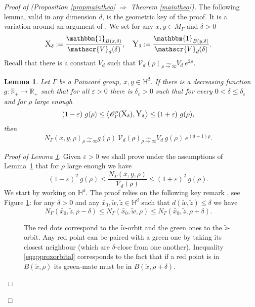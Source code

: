 \documentclass[JEP,XML,SOM,Unicode,NoFloatCountersInSection,published]{cedram}
\let\mathcal\mathscr
\let\epsilon\varepsilon
\theoremstyle{plain}
\newtheorem{lemma}[equation]{Lemma}
\theoremstyle{definition}
\newcommand{\HH}{\mathbb{H}}
\newcommand{\RR}{\mathbb{R}}
\newcommand{\equivaut}[1]{\underset{#1}{\sim}}
\begin{document}
\begin{proof}[Proof of (Proposition \ref{propmaintheo} $\Rightarrow$ Theorem \ref{maintheo})]
The following lemma, valid in any dimension $d$, is the geometric key of the proof. It is a variation around an argument of \cite{arteskinmac}. We set for any $x,y \in M_{\Gamma}$ and $\delta > 0$
\[
\text{\large{X}}_{\delta} := \frac{\mathbbm{1}_{B(x,\delta)}}{\mathcal{V}_d(\delta)}, \quad \text{\large{Y}}_{\delta} := \frac{\mathbbm{1}_{B(y,\delta)}}{\mathcal{V}_d(\delta)}.
\]
Recall that there is a constant $V_d$ such that $\mathcal{V}_d(\rho) \equivaut{\rho \to \infty} V_d \ e^{ 2 \rho}$.

\begin{lemma}
\label{lemmapproxorbital}
Let $\Gamma$ be a Poincaré group, $x,y \in \mathbb{H}^d$. If there is a decreasing function $g : \RR_+ \to \RR_+$ such that for all $\epsilon > 0$ there is $\delta_{\epsilon} > 0$ such that for every $ 0 < \delta \le \delta_{\epsilon}$ and for $\rho$ large enough
\[
(1 - \epsilon) \ g(\rho) \le \left< \mathcal{O}_{\Gamma}^{\rho}(\text{\large{X}}_{\delta}), \text{\large{Y}}_{\delta} \right> \le (1 + \epsilon) \ g(\rho),
\]
then
\[
N_{\Gamma}(x,y,\rho) \equivaut{\rho \to \infty} g(\rho) \ \mathcal{V}_d(\rho) \equivaut{\rho \to \infty} V_d \ g(\rho) \ e^{(d-1)\rho}.
\]
\end{lemma}

\begin{proof}[Proof of Lemma \ref{lemmapproxorbital}]
Given $\epsilon > 0$ we shall prove under the assumptions of Lem\-ma~\ref{lemmapproxorbital} that for $\rho$ large enough we have
\[
(1 -\epsilon)^2 \ g(\rho) \le \frac{N_{\Gamma}(x,y,\rho)}{\mathcal{V}_d(\rho)} \le (1 +\epsilon)^2 \ g(\rho).
\]
We start by working on $\HH^d$. The proof relies on the following key remark \cite[\S 2]{arteskinmac}, see Figure \ref{figure dessin}: for any $\delta >0$ and any $\tilde{x_0},\tilde{w},\tilde{z} \in \mathbb{H}^d$ such that $d(\tilde{w},\tilde{z}) \le \delta$ we have
\begin{equation}
\label{eqapproxorbital}
N_{\Gamma}(\tilde{x_0},\tilde{z}, \rho - \delta) \le N_{\Gamma}(\tilde{x_0},\tilde{w}, \rho) \le N_{\Gamma}(\tilde{x_0},\tilde{z}, \rho + \delta).
\end{equation}

\begin{figure}[htb]
\begin{center}
\def\svgwidth{0.6 \columnwidth}

\caption{The red dots correspond to the $\tilde{w}$-orbit and the green ones to the $\tilde{z}$-orbit. Any red point can be paired with a green one by taking its closest neighbour (which are $\delta$-close from one another). Inequality \eqref{eqapproxorbital} corresponds to the fact that if a red point is in $B(\tilde{x},\rho)$ its green-mate must be in $B(\tilde{x}, \rho + \delta)$.}
\label{figure dessin}
\end{center}
\end{figure}


\end{proof}
\end{proof}
\end{document}
